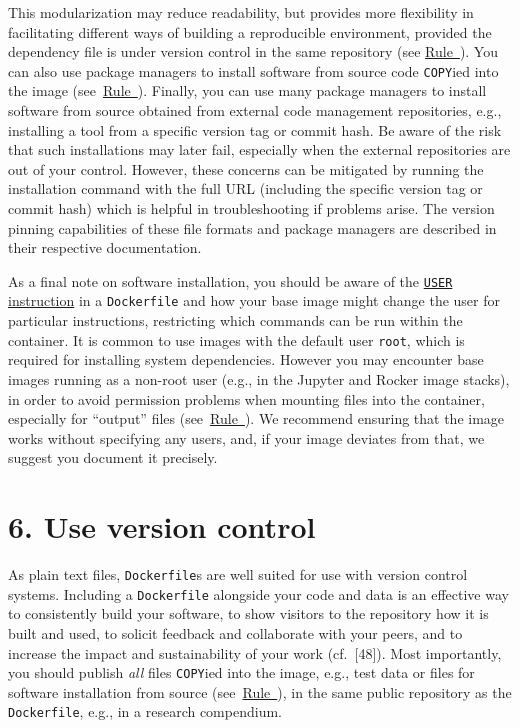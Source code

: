 \documentclass[10pt,letterpaper]{article}
\begin{document}
This modularization may reduce readability, but provides more
flexibility in facilitating different ways of building a reproducible
environment, provided the dependency file is under version control in
the same repository (see
\hyperref[{rule:publish}]{Rule~}). You can also
use package managers to install software from source code
\texttt{COPY}ied into the image
(see~\hyperref[{rule:mount}]{Rule~}). Finally, you
can use many package managers to install software from source obtained
from external code management repositories, e.g., installing a tool from
a specific version tag or commit hash. Be aware of the risk that such
installations may later fail, especially when the external repositories
are out of your control. However, these concerns can be mitigated by
running the installation command with the full URL (including the
specific version tag or commit hash) which is helpful in troubleshooting
if problems arise. The version pinning capabilities of these file
formats and package managers are described in their respective
documentation.

As a final note on software installation, you should be aware of the
\href{https://docs.docker.com/engine/reference/builder/\#user}{\texttt{USER}
instruction} in a \texttt{Dockerfile} and how your base image might
change the user for particular instructions, restricting which commands
can be run within the container. It is common to use images with the
default user \texttt{root}, which is required for installing system
dependencies. However you may encounter base images running as a
non-root user (e.g., in the Jupyter and Rocker image stacks), in order
to avoid permission problems when mounting files into the container,
especially for ``output'' files
(see~\hyperref[{rule:mount}]{Rule~}). We recommend
ensuring that the image works without specifying any users, and, if your
image deviates from that, we suggest you document it precisely.

\hypertarget{use-version-control}{%
\section*{6. Use version control}\label{use-version-control}}

  \label{rule:publish} 

As plain text files, \texttt{Dockerfile}s are well suited for use with
version control systems. Including a \texttt{Dockerfile} alongside your
code and data is an effective way to consistently build your software,
to show visitors to the repository how it is built and used, to solicit
feedback and collaborate with your peers, and to increase the impact and
sustainability of your work (cf.~{[}48{]}). Most importantly, you should
publish \emph{all} files \texttt{COPY}ied into the image, e.g., test
data or files for software installation from source
(see~\hyperref[{rule:mount}]{Rule~}), in the same
public repository as the \texttt{Dockerfile}, e.g., in a research
compendium.
\end{document}
